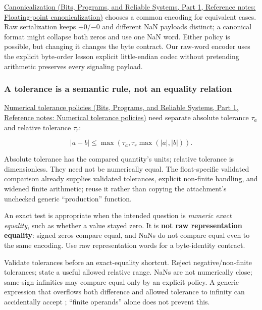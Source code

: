 \href{../01-Bits-Programs-and-Reliable-Systems-P01/main.pdf\#nameddest=appendix-e90053a4b201}{Canonicalization (Bits, Programs, and Reliable Systems, Part 1, Reference notes: Floating-point canonicalization)} chooses a common encoding for equivalent cases. Raw serialization keeps +0/−0 and different NaN payloads distinct; a canonical format might collapse both zeros and use one NaN word. Either policy is possible, but changing it changes the byte contract. Our raw-word encoder uses the explicit byte-order lesson explicit little-endian codec without pretending arithmetic preserves every signaling payload.

\subsubsection{A tolerance is a semantic rule, not an equality relation}\label{05-engine-i-ch001-a-tolerance-is-a-semantic-rule-not-an-equality-relation}

\hypertarget{05-engine-i-ch001-a-tolerance-is-a-semantic-rule-not-an-equality-relation}{}

\href{../01-Bits-Programs-and-Reliable-Systems-P01/main.pdf\#nameddest=appendix-0ec599f8ba27}{Numerical tolerance policies (Bits, Programs, and Reliable Systems, Part 1, Reference notes: Numerical tolerance policies)} need separate absolute tolerance \(\tau_a\) and relative tolerance \(\tau_r\):

\[
|a-b|\le\max\!\left(\tau_a,\tau_r\max(|a|,|b|)\right).
\]

Absolute tolerance has the compared quantity's units; relative tolerance is dimensionless. They need not be numerically equal. The float-specific validated comparison already supplies validated tolerances, explicit non-finite handling, and widened finite arithmetic; reuse it rather than copying the attachment's unchecked generic ``production'' function.

An exact \BookInlineCode{{=}{=}}{==} test is appropriate when the intended question is \emph{numeric exact equality}, such as whether a value stayed zero. It is \textbf{not raw representation equality}: signed zeros compare equal, and NaNs do not compare equal even to the same encoding. Use raw representation words for a byte-identity contract.

Validate tolerances before an exact-equality shortcut. Reject negative/non-finite tolerances; state a useful allowed relative range. NaNs are not numerically close; same-sign infinities may compare equal only by an explicit policy. A generic expression that overflows both difference and allowed tolerance to infinity can accidentally accept ; ``finite operands'' alone does not prevent this.

